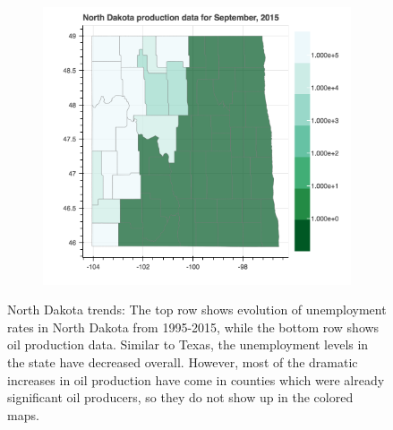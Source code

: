 \documentclass[11pt,letterpaper]{article}
\begin{document}
\begin{figure}[h!]
\begin{subfigure}{0.3\textwidth}
\includegraphics[width=1.2\linewidth]{nd_prod_2015}
\end{subfigure}
\caption{North Dakota trends: The top row shows evolution of unemployment rates in North Dakota from 1995-2015, while the bottom row shows oil production data. Similar to Texas, the unemployment levels in the state have decreased overall. However, most of the dramatic increases in oil production have come in counties which were already significant oil producers, so they do not show up in the colored maps. }
\label{fig:nd_maps}
\end{figure}
\end{document}

